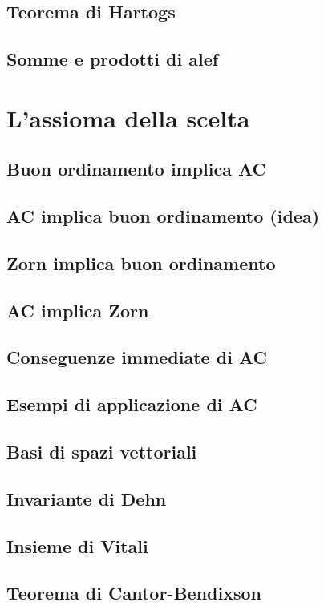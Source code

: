 \documentclass[11pt]{scrartcl}
\begin{document}
\subsection{Teorema di Hartogs}
\newpage
\subsection{Somme e prodotti di alef}



\newpage
\section{L'assioma della scelta}
\subsection{Buon ordinamento implica AC}
\newpage
\subsection{AC implica buon ordinamento (idea)}
\newpage
\subsection{Zorn implica buon ordinamento}
\newpage
\subsection{AC implica Zorn}
\newpage
\subsection{Conseguenze immediate di AC}
\newpage
\subsection{Esempi di applicazione di AC}
\newpage
\subsection{Basi di spazi vettoriali}
\newpage
\subsection{Invariante di Dehn}
\newpage
\subsection{Insieme di Vitali}
\newpage
\subsection{Teorema di Cantor-Bendixson}
\newpage
\end{document}
